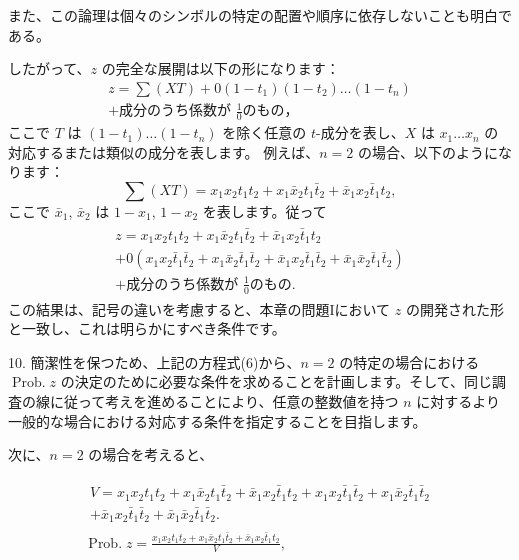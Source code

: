 \documentclass[a4paper,11pt,openany]{ltjsbook}
\begin{document}
また、この論理は個々のシンボルの特定の配置や順序に依存しないことも明白である。

したがって、$z$ の完全な展開は以下の形になります：
\begin{multline*}
  z = \sum(XT) + 0(1-t_1)(1-t_2)\dotsc (1-t_n)   \\
      + \text{成分のうち係数が }\frac{1}{0} のもの，
  \tag{5}
\end{multline*}
ここで $T$ は $(1-t_1)\dotsc (1-t_n)$ を除く任意の $t$-成分を表し、$X$ は $x_1\dotsc x_n$ の対応するまたは類似の成分を表します。
例えば、$n = 2$ の場合、以下のようになります：
\begin{equation*}
\sum (XT) = x_1 x_2 t_1 t_2 + x_1 \bar{x}_2 t_1 \bar{t}_2 + \bar{x}_1 x_2 \bar{t}_1 t_2,
\end{equation*}
ここで $\bar{x}_1$, $\bar{x}_2$ は $1 - x_1$, $1 - x_2$ を表します。従って
\begin{gather*} \tag{6}
\begin{split}
z = x_1 x_2 t_1 t_2
+ x_1 \bar{x}_2 t_1 \bar{t}_2
+ \bar{x}_1 x_2 \bar{t}_1 t_2 \\
+ 0(x_1 x_2 \bar{t}_1 \bar{t}_2
+ x_1 \bar{x}_2 \bar{t}_1 \bar{t}_2
+ \bar{x}_1 x_2 \bar{t}_1 \bar{t}_2
+ \bar{x}_1 \bar{x}_2 \bar{t}_1 \bar{t}_2) \\
+ \text{成分のうち係数が }\frac{1}{0} のもの.
\end{split}
\end{gather*}
この結果は、記号の違いを考慮すると、本章の問題Iにおいて $z$ の開発された形と一致し、これは明らかにすべき条件です。

10. 簡潔性を保つため、上記の方程式(6)から、$n = 2$ の特定の場合における $\operatorname{Prob. } z$ の決定のために必要な条件を求めることを計画します。そして、同じ調査の線に従って考えを進めることにより、任意の整数値を持つ $n$ に対するより一般的な場合における対応する条件を指定することを目指します。

次に、$n = 2$ の場合を考えると、

\begin{gather*}
\begin{split}
V = x_1 x_2 t_1 t_2
+ x_1 \bar{x}_2 t_1 \bar{t}_2
+ \bar{x}_1 x_2 \bar{t}_1 t_2
+ x_1 x_2 \bar{t}_1 \bar{t}_2
+ x_1 \bar{x}_2 \bar{t}_1 \bar{t}_2
\\
+ \bar{x}_1 x_2 \bar{t}_1 \bar{t}_2
+ \bar{x}_1 \bar{x}_2 \bar{t}_1 \bar{t}_2.
\end{split}
\\
\operatorname{Prob. } z = \frac{x_1 x_2 t_1 t_2
+ x_1 \bar{x}_2 t_1 \bar{t}_2
+ \bar{x}_1 x_2 \bar{t}_1 t_2}{V},
\end{gather*}
\end{document}
